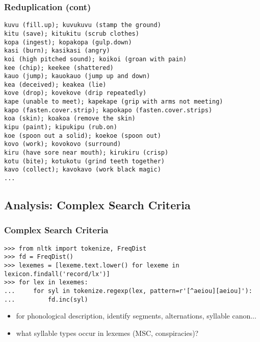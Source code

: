\documentclass{beamer}             %
\begin{document}
\begin{frame}[fragile]
\frametitle{Reduplication (cont)}
\scriptsize
\begin{verbatim}
kuvu (fill.up); kuvukuvu (stamp the ground)
kitu (save); kitukitu (scrub clothes)
kopa (ingest); kopakopa (gulp.down)
kasi (burn); kasikasi (angry)
koi (high pitched sound); koikoi (groan with pain)
kee (chip); keekee (shattered)
kauo (jump); kauokauo (jump up and down)
kea (deceived); keakea (lie)
kove (drop); kovekove (drip repeatedly)
kape (unable to meet); kapekape (grip with arms not meeting)
kapo (fasten.cover.strip); kapokapo (fasten.cover.strips)
koa (skin); koakoa (remove the skin)
kipu (paint); kipukipu (rub.on)
koe (spoon out a solid); koekoe (spoon out)
kovo (work); kovokovo (surround)
kiru (have sore near mouth); kirukiru (crisp)
kotu (bite); kotukotu (grind teeth together)
kavo (collect); kavokavo (work black magic)
...
\end{verbatim}
\end{frame}

\subsection{Analysis: Complex Search Criteria}

\begin{frame}[fragile]
\frametitle{Complex Search Criteria}
\scriptsize
\begin{verbatim}
>>> from nltk import tokenize, FreqDist
>>> fd = FreqDist()
>>> lexemes = [lexeme.text.lower() for lexeme in lexicon.findall('record/lx')]
>>> for lex in lexemes:
...     for syl in tokenize.regexp(lex, pattern=r'[^aeiou][aeiou]'):
...         fd.inc(syl)
\end{verbatim}

\normalsize
\begin{itemize}
\item for phonological description, identify segments, alternations,
  syllable canon...
\item what syllable types occur in lexemes (MSC, conspiracies)?
\end{itemize}

\end{frame}
\end{document}
